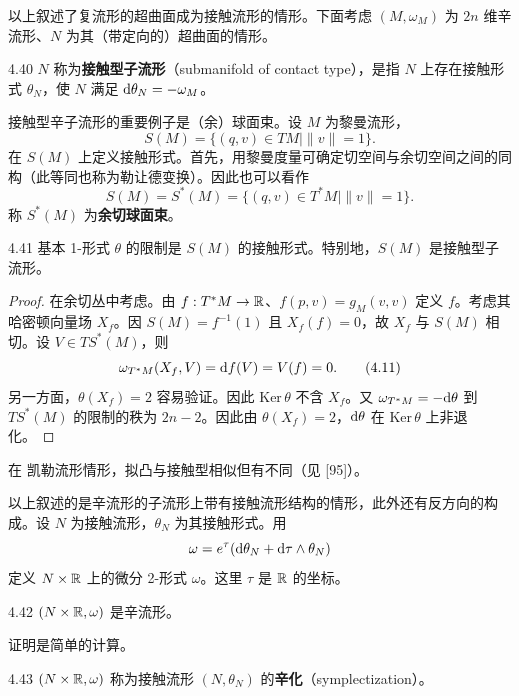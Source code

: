 以上叙述了复流形的超曲面成为接触流形的情形。下面考虑 $(M,\omega_M)$ 为 $2n$ 维辛流形、$N$ 为其（带定向的）超曲面的情形。

\begin{definition}{4.40}
  $N$ 称为\textbf{接触型子流形}（submanifold of contact type），是指 $N$ 上存在接触形式 $\theta_N$，使 $N$ 满足 $\mathrm{d}\theta_N=-\omega_M$。
\end{definition}

接触型辛子流形的重要例子是（余）球面束。设 $M$ 为黎曼流形，
\begin{equation}
  S(M)=\{(q,v)\in TM\mid \|v\|=1\}. \tag{4.10}
\end{equation}
在 $S(M)$ 上定义接触形式。首先，用黎曼度量可确定切空间与余切空间之间的同构（此等同也称为勒让德变换）。因此也可以看作
\[
  S(M)=S^*(M)=\{(q,v)\in T^*M\mid \|v\|=1\}.
\]
称 $S^*(M)$ 为\textbf{余切球面束}。

\begin{lemma*}{4.41}
  基本 1-形式 $\theta$ 的限制是 $S(M)$ 的接触形式。特别地，$S(M)$ 是接触型子流形。
\end{lemma*}
\begin{proof}
  在余切丛中考虑。由 $f:T^*M\to\mathbb{R}$、$f(p,v)=g_M(v,v)$ 定义 $f$。考虑其哈密顿向量场 $X_f$。因 $S(M)=f^{-1}(1)$ 且 $X_f(f)=0$，故 $X_f$ 与 $S(M)$ 相切。设 $V\in TS^*(M)$，则
  \begin{equation}
    \omega_{T^*M}(X_f,V)=\mathrm{d} f(V)=V(f)=0. \tag{4.11}
  \end{equation}
  另一方面，$\theta(X_f)=2$ 容易验证。因此 $\mathrm{Ker}\,\theta$ 不含 $X_f$。又 $\omega_{T^*M}=-\mathrm{d}\theta$ 到 $TS^*(M)$ 的限制的秩为 $2n-2$。因此由 $\theta(X_f)=2$，$\mathrm{d}\theta$ 在 $\mathrm{Ker}\,\theta$ 上非退化。
\end{proof}

在 凯勒流形情形，拟凸与接触型相似但有不同（见 [95]）。

以上叙述的是辛流形的子流形上带有接触流形结构的情形，此外还有反方向的构成。设 $N$ 为接触流形，$\theta_N$ 为其接触形式。用
\[
  \omega=e^\tau(\mathrm{d}\theta_N+\mathrm{d}\tau\wedge\theta_N)
\]
定义 $N\times\mathbb{R}$ 上的微分 2-形式 $\omega$。这里 $\tau$ 是 $\mathbb{R}$ 的坐标。

\begin{lemma}{4.42}
  $(N\times\mathbb{R},\omega)$ 是辛流形。
\end{lemma}

证明是简单的计算。

\begin{definition}{4.43}
  $(N\times\mathbb{R},\omega)$ 称为接触流形 $(N,\theta_N)$ 的\textbf{辛化}（symplectization）。
\end{definition}


